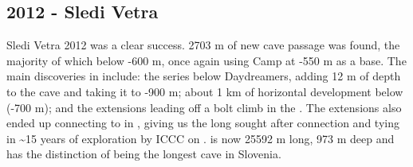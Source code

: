 \begin{tcolorbox}
\chapter{2012 - Sledi Vetra}

Sledi Vetra 2012 was a clear success. 2703 m of new cave passage was
found, the majority of which below -600 m, once again using Camp
 at -550 m as a base. The main discoveries in
 include: the  series below
Daydreamers, adding 12 m of depth to the cave and taking it to -900 m;
about 1 km of horizontal development below 
(-700 m); and the  extensions leading off a bolt climb in
the . The  extensions also ended
up connecting to  in , giving us the long
sought after connection and tying in \textasciitilde 15 years of
exploration by ICCC on .  is now 25592 m long, 973
m deep and has the distinction of being the longest cave in Slovenia.

\end{tcolorbox}
\BgThispage









